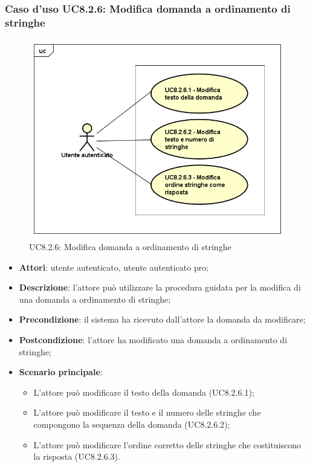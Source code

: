 \subsubsection{Caso d’uso UC8.2.6: Modifica domanda a ordinamento di stringhe}
	\label{UC8.2.6}
	\begin{figure}[h]
		\centering
		\includegraphics[scale=0.45,keepaspectratio]{UML/UC8_2_6.png}
		\caption{UC8.2.6: Modifica domanda a ordinamento di stringhe}
	\end{figure}
	\FloatBarrier
\begin{itemize}
	\item\textbf{Attori}: utente autenticato, utente autenticato pro;
	\item\textbf{Descrizione}: l'attore può utilizzare la procedura guidata per la modifica di una domanda a ordinamento di stringhe;
	\item\textbf{Precondizione}: il sistema ha ricevuto dall'attore la domanda da modificare; 
	\item \textbf{Postcondizione}: l'attore ha modificato una domanda a ordinamento di stringhe;
	\item\textbf{Scenario principale}:
		\begin{itemize}
			\item L'attore può modificare il testo della domanda (UC8.2.6.1);
			\item L'attore può modificare il testo e il numero delle stringhe che compongono la sequenza della domanda (UC8.2.6.2);
			\item L'attore può modificare l'ordine corretto delle stringhe che costituiscono la risposta (UC8.2.6.3).
		\end{itemize}
\end{itemize}

